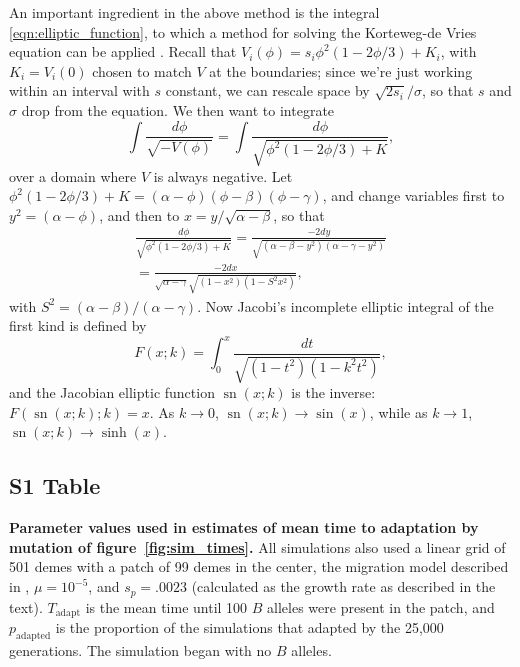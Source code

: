 \documentclass[10pt,letterpaper]{article}
\newcommand{\citep}[1]{\cite{#1}}
\DeclareMathOperator{\sn}{sn}
\begin{document}
An important ingredient in the above method is the integral \eqref{eqn:elliptic_function},
to which a method for solving the Korteweg-de Vries equation can be applied \citep{NEQwiki}.
Recall that $V_i(\phi) =  s_i \phi^2(1-2\phi/3) + K_i$, with $K_i = V_i(0)$ chosen to match $V$ at the boundaries;
since we're just working within an interval with $s$ constant, we can rescale space by $\sqrt{2 s_i}/\sigma$,
so that $s$ and $\sigma$ drop from the equation.
We then want to integrate
\[
    \int \frac{ d\phi }{ \sqrt{-V(\phi)} } = 
         \int \frac{ d\phi }{ \sqrt{ \phi^2 (1-2\phi/3) + K } } ,
\]
over a domain where $V$ is always negative.
Let $\phi^2(1-2\phi/3)+K = (\alpha-\phi)(\phi-\beta)(\phi-\gamma)$,
and change variables first to $y^2=(\alpha-\phi)$, 
and then to $x = y/\sqrt{\alpha-\beta}$, so that
\begin{align*}
    \frac{ d\phi }{ \sqrt{ \phi^2 (1-2\phi/3) + K } } 
        = \frac{ - 2 dy }{ \sqrt{ (\alpha-\beta-y^2) (\alpha-\gamma-y^2) } } \\
        = \frac{ - 2 dx }{ \sqrt{\alpha-\gamma} \sqrt{ (1-x^2) (1-S^2 x^2) } } ,
\end{align*}
with $S^2 = (\alpha-\beta)/(\alpha-\gamma)$.
Now Jacobi's incomplete elliptic integral of the first kind is defined by
\[
    F(x;k) = \int_0^x \frac{dt}{\sqrt{ (1-t^2)(1-k^2t^2) }} ,
\]
and the Jacobian elliptic function $\sn(x;k)$ is the inverse: $F(\sn(x;k);k) = x$.
As $k \to 0$, $\sn(x;k) \to \sin(x)$, while as $k \to 1$, $\sn(x;k) \to \sinh(x)$.



% 


\subsection*{S1 Table}
\label{stab:mutation_params}

%

\textbf{Parameter values used in estimates of mean time to adaptation by mutation of figure~\ref{fig:sim_times}.}
All simulations also used a linear grid of 501 demes with a patch of 99 demes in the center, 
the migration model described in ,
$\mu=10^{-5}$, and $s_p=.0023$ (calculated as the growth rate as described in the text).
$T_\text{adapt}$ is the mean time until 100 $B$ alleles were present in the patch,
and $p_\text{adapted}$ is the proportion of the simulations that adapted by the 25,000 generations.
The simulation began with no $B$ alleles.
\end{document}
